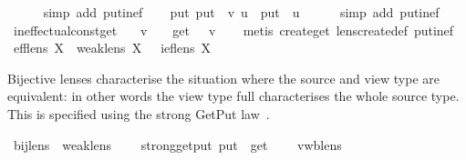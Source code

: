 \begin{isabellebody}
\ \ \ \ \isamarkupfalse%
\ {\isacharparenleft}simp\ add{\isacharcolon}\ put{\isacharunderscore}inef{\isacharparenright}\isanewline
\ \ \isamarkupfalse%
\ {\isachardoublequoteopen}put\ {\isacharparenleft}put\ {\isasymsigma}\ v{\isacharparenright}\ u\ {\isacharequal}\ put\ {\isasymsigma}\ u{\isachardoublequoteclose}\isanewline
\ \ \ \ \isamarkupfalse%
\ {\isacharparenleft}simp\ add{\isacharcolon}\ put{\isacharunderscore}inef{\isacharparenright}\isanewline
{}\isamarkupfalse%
%
\endisatagproof
{\isafoldproof}%
%
\isadelimproof
\isanewline
%
\endisadelimproof
\isanewline
{}\isamarkupfalse%
\ ineffectual{\isacharunderscore}const{\isacharunderscore}get{\isacharcolon}\isanewline
\ \ {\isachardoublequoteopen}{\isasymexists}\ v{\isachardot}\ \ {\isasymforall}\ {\isasymsigma}{\isachardot}\ get\ {\isasymsigma}\ {\isacharequal}\ v{\isachardoublequoteclose}\isanewline
%
\isadelimproof
\ \ %
\endisadelimproof
%
\isatagproof
{}\isamarkupfalse%
\ {\isacharparenleft}metis\ create{\isacharunderscore}get\ lens{\isacharunderscore}create{\isacharunderscore}def\ put{\isacharunderscore}inef{\isacharparenright}%
\endisatagproof
{\isafoldproof}%
%
\isadelimproof
\isanewline
%
\endisadelimproof
\isanewline
{}\isamarkupfalse%
\isanewline
\isanewline
{}\isamarkupfalse%
\ {\isachardoublequoteopen}eff{\isacharunderscore}lens\ X\ {\isasymequiv}\ {\isacharparenleft}weak{\isacharunderscore}lens\ X\ {\isasymand}\ {\isacharparenleft}{\isasymnot}\ ief{\isacharunderscore}lens\ X{\isacharparenright}{\isacharparenright}{\isachardoublequoteclose}%
\isamarkuptrue%
%
\begin{isamarkuptext}%
Bijective lenses characterise the situation where the source and view type are equivalent:
  in other words the view type full characterises the whole source type. This is specified using
  the strong GetPut law~\cite{Foster09,Fischer2015}.%
\end{isamarkuptext}\isamarkuptrue%
\isamarkupfalse%
\ bij{\isacharunderscore}lens\ {\isacharequal}\ weak{\isacharunderscore}lens\ {\isacharplus}\isanewline
\ \ \ strong{\isacharunderscore}get{\isacharunderscore}put{\isacharcolon}\ {\isachardoublequoteopen}put\ {\isasymsigma}\ {\isacharparenleft}get\ {\isasymrho}{\isacharparenright}\ {\isacharequal}\ {\isasymrho}{\isachardoublequoteclose}\isanewline
{}\isanewline
\isanewline
{}\isamarkupfalse%
\ vwb{\isacharunderscore}lens\isanewline

\end{isabellebody}
